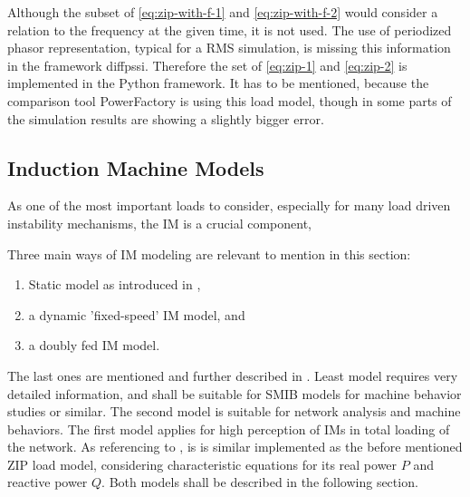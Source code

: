 Although the subset of \autoref{eq:zip-with-f-1} and \autoref{eq:zip-with-f-2} would consider a relation to the frequency at the given time, it is not used. The use of periodized phasor representation, typical for a \acs{RMS} simulation, is missing this information in the framework diffpssi. Therefore the set of \autoref{eq:zip-1} and \autoref{eq:zip-2} is implemented in the Python framework. It has to be mentioned, because the comparison tool PowerFactory is using this load model, though in some parts of the simulation results are showing a slightly bigger error.

\subsection{Induction Machine Models}

As one of the most important loads to consider, especially for many load driven instability mechanisms, the \ac{IM} is a crucial component, \quelle


Three main ways of \acs{IM} modeling are relevant to mention in this section:
\begin{enumerate}
        \item Static model as introduced in \textcite{IEEEGuideLoad2022},
        \item a dynamic 'fixed-speed' \acs{IM} model, and
        \item a doubly fed \acs{IM} model.
\end{enumerate} 
The last ones are mentioned and further described in \textcite{machowskiPowerSystemDynamics2020}. Least model requires very detailed information, and shall be suitable for \acs{SMIB} models for machine behavior studies or similar. The second model is suitable for network analysis and machine behaviors. The first model applies for high perception of \acsp{IM} in total loading of the network. As referencing to \textcite{IEEEGuideLoad2022}, is is similar implemented as the before mentioned ZIP load model, considering characteristic equations for its real power $P$ and reactive power $Q$. Both models shall be described in the following section.

